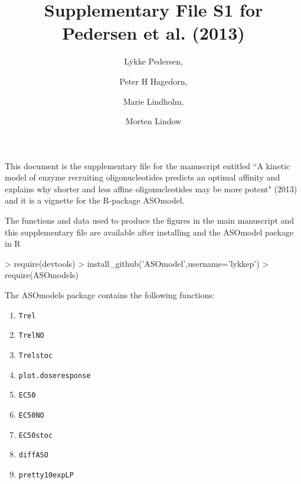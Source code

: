 \documentclass[a4paper,11pt]{article}
\title{Supplementary File S1 for Pedersen et al. (2013)}
\author{Lykke Pedersen, \and Peter H Hagedorn, \and Marie Lindholm, \and Morten Lindow}
\date{}
\begin{document}

\maketitle

This document is the supplementary file for the manuscript entitled ``A kinetic model of enzyme recruiting oligonucleotides predicts an optimal affinity and explains why shorter and less affine oligonucleotides may be more potent" (2013) and it is a vignette for the R-package ASOmodel.

The functions and data used to produce the figures in the main manuscript and this supplementary file are available after installing and the ASOmodel package in R
\begin{Schunk}
\begin{Sinput}
> require(devtools)
> install_github('ASOmodel',username='lykkep')
> require(ASOmodels)
\end{Sinput}
\end{Schunk}
The ASOmodels package contains the following functions:
\begin{enumerate}
\item \texttt{Trel}
\item \texttt{TrelNO}
\item \texttt{Trelstoc}
\item \texttt{plot.doseresponse}
\item \texttt{EC50}
\item \texttt{EC50NO}
\item \texttt{EC50stoc}
\item \texttt{diffASO}
\item \texttt{pretty10expLP}
\end{enumerate}

\newpage

\tableofcontents

\newpage


\end{document}
